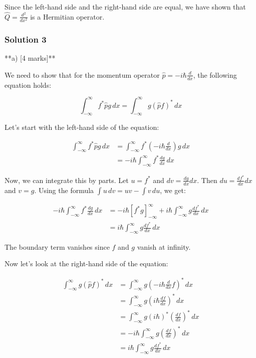 \documentclass{article}
\begin{document}
Since the left-hand side and the right-hand side are equal, we have shown that $\hat{Q} = \frac{d^2}{dx^2}$ is a Hermitian operator.

\subsubsection{Solution 3}
**a) [4 marks]**

We need to show that for the momentum operator $\hat{p} = -i\hbar \frac{d}{dx}$, the following equation holds:

\begin{equation*}
\int_{-\infty}^{\infty} f^* \hat{p} g \, dx = \int_{-\infty}^{\infty} g (\hat{p} f)^* \, dx
\end{equation*}

Let's start with the left-hand side of the equation:

\begin{align*}
\int_{-\infty}^{\infty} f^* \hat{p} g \, dx &= \int_{-\infty}^{\infty} f^* \left( -i\hbar \frac{d}{dx} \right) g \, dx \\
&= -i\hbar \int_{-\infty}^{\infty} f^* \frac{dg}{dx} \, dx
\end{align*}

Now, we can integrate this by parts.  Let $u = f^*$ and $dv = \frac{dg}{dx} dx$. Then $du = \frac{df^*}{dx} dx$ and $v = g$. Using the formula $\int u \, dv = uv - \int v \, du$, we get:

\begin{align*}
-i\hbar \int_{-\infty}^{\infty} f^* \frac{dg}{dx} \, dx &= -i\hbar \left[ f^* g \right]_{-\infty}^{\infty} + i\hbar \int_{-\infty}^{\infty} g \frac{df^*}{dx} \, dx \\
&= i\hbar \int_{-\infty}^{\infty} g \frac{df^*}{dx} \, dx
\end{align*}

The boundary term vanishes since $f$ and $g$ vanish at infinity.

Now let's look at the right-hand side of the equation:

\begin{align*}
\int_{-\infty}^{\infty} g (\hat{p} f)^* \, dx &= \int_{-\infty}^{\infty} g \left( -i\hbar \frac{d}{dx} f \right)^* \, dx \\
&= \int_{-\infty}^{\infty} g \left( i\hbar \frac{df}{dx} \right)^* \, dx \\
&=  \int_{-\infty}^{\infty} g \left( i\hbar \right)^* \left( \frac{df}{dx} \right)^* \, dx \\
&= -i\hbar \int_{-\infty}^{\infty} g  \left( \frac{df}{dx} \right)^* \, dx \\
&= i\hbar \int_{-\infty}^{\infty} g \frac{df^*}{dx} \, dx
\end{align*}
\end{document}
